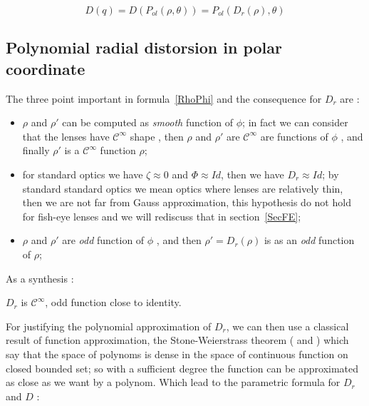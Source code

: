 \begin{equation}
	D(q)  =   D(P_{ol}(\rho,\theta))  =   P_{ol}(D_r(\rho),\theta)
\end{equation}


\subsection{Polynomial radial distorsion in polar coordinate}

The three point important in formula~\ref{RhoPhi} and the consequence for $D_r$  are :

\begin{itemize}
   \item $\rho$ and $\rho'$ can be computed as \emph{smooth} function of $\phi$; in fact we can 
         consider that the lenses have $\mathcal{C}^{\infty}$ shape ,  then   $\rho$ and $\rho'$ 
         are $\mathcal{C}^{\infty}$ are functions of $\phi$ , and finally $\rho'$ is a 
         $\mathcal{C}^{\infty}$ function $\rho$;

   \item for standard optics we have  $\zeta \approx 0$ and $\Phi \approx Id$,  then we have $D_r \approx Id$;
         by standard standard optics we mean optics where lenses are relatively thin, then  we are not far from Gauss approximation,
         this hypothesis do not hold for fish-eye lenses and we will rediscuss that in section~\ref{SecFE};

   \item $\rho$ and $\rho'$ are  \emph{odd}  function of $\phi$ , and then $\rho'=D_r(\rho)$ is as an \emph{odd}  function of 
        $\rho$;

\end{itemize}

As a synthesis :

\begin{proposal} \;
\label{DrHyp}
       $D_r$ is $\mathcal{C}^{\infty}$, odd function close to identity.
\end{proposal}

For justifying the polynomial approximation of $D_r$, we can then use a classical result of function 
approximation, the Stone-Weierstrass theorem (\cite{Weierstrass1885} and \cite{Stone1937})
which say that the space of polynoms is dense in the space of continuous function on closed bounded set;
so with a sufficient degree the function can be approximated as close as we want by a polynom.
Which lead to the parametric formula for $D_r$ and $D$ :

